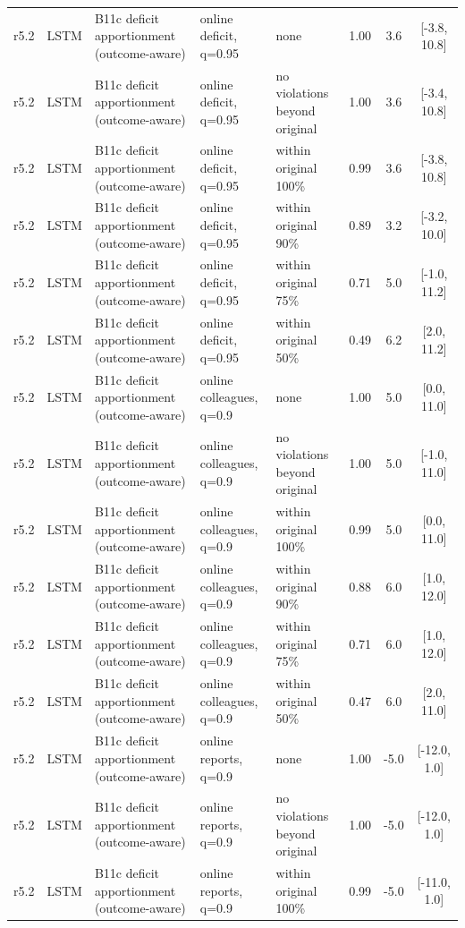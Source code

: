 \begin{longtable}{lllp{4.2cm}p{3.4cm}ccc}
r5.2 & LSTM & B11c deficit apportionment (outcome-aware) & online deficit, q=0.95 & none & 1.00 & 3.6 & [-3.8, 10.8] \\
r5.2 & LSTM & B11c deficit apportionment (outcome-aware) & online deficit, q=0.95 & no violations beyond original & 1.00 & 3.6 & [-3.4, 10.8] \\
r5.2 & LSTM & B11c deficit apportionment (outcome-aware) & online deficit, q=0.95 & within original 100\% & 0.99 & 3.6 & [-3.8, 10.8] \\
r5.2 & LSTM & B11c deficit apportionment (outcome-aware) & online deficit, q=0.95 & within original 90\% & 0.89 & 3.2 & [-3.2, 10.0] \\
r5.2 & LSTM & B11c deficit apportionment (outcome-aware) & online deficit, q=0.95 & within original 75\% & 0.71 & 5.0 & [-1.0, 11.2] \\
r5.2 & LSTM & B11c deficit apportionment (outcome-aware) & online deficit, q=0.95 & within original 50\% & 0.49 & 6.2 & [2.0, 11.2] \\
r5.2 & LSTM & B11c deficit apportionment (outcome-aware) & online colleagues, q=0.9 & none & 1.00 & 5.0 & [0.0, 11.0] \\
r5.2 & LSTM & B11c deficit apportionment (outcome-aware) & online colleagues, q=0.9 & no violations beyond original & 1.00 & 5.0 & [-1.0, 11.0] \\
r5.2 & LSTM & B11c deficit apportionment (outcome-aware) & online colleagues, q=0.9 & within original 100\% & 0.99 & 5.0 & [0.0, 11.0] \\
r5.2 & LSTM & B11c deficit apportionment (outcome-aware) & online colleagues, q=0.9 & within original 90\% & 0.88 & 6.0 & [1.0, 12.0] \\
r5.2 & LSTM & B11c deficit apportionment (outcome-aware) & online colleagues, q=0.9 & within original 75\% & 0.71 & 6.0 & [1.0, 12.0] \\
r5.2 & LSTM & B11c deficit apportionment (outcome-aware) & online colleagues, q=0.9 & within original 50\% & 0.47 & 6.0 & [2.0, 11.0] \\
r5.2 & LSTM & B11c deficit apportionment (outcome-aware) & online reports, q=0.9 & none & 1.00 & -5.0 & [-12.0, 1.0] \\
r5.2 & LSTM & B11c deficit apportionment (outcome-aware) & online reports, q=0.9 & no violations beyond original & 1.00 & -5.0 & [-12.0, 1.0] \\
r5.2 & LSTM & B11c deficit apportionment (outcome-aware) & online reports, q=0.9 & within original 100\% & 0.99 & -5.0 & [-11.0, 1.0] \\

\end{longtable}
